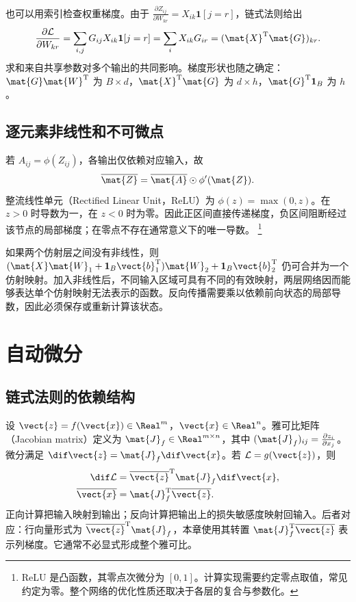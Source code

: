 \documentclass[../textbook.tex]{subfiles}
\begin{document}
也可以用索引检查权重梯度。由于
$\frac{\partial Z_{ij}}{\partial W_{kr}}=X_{ik}\mathbf1[j=r]$，链式法则给出
\begin{equation}
 \frac{\partial\mathcal L}{\partial W_{kr}}
 =\sum_{i,j}G_{ij}X_{ik}\mathbf1[j=r]
 =\sum_iX_{ik}G_{ir}=(\mat{X}^{\mathrm{T}}\mat{G})_{kr}.
\end{equation}
求和来自共享参数对多个输出的共同影响。梯度形状也随之确定：$\mat{G}\mat{W}^{\mathrm{T}}$ 为 $B\times d$，$\mat{X}^{\mathrm{T}}\mat{G}$ 为 $d\times h$，$\mat{G}^{\mathrm{T}}\mathbf1_B$ 为 $h$。

\subsection{逐元素非线性和不可微点}
若 $A_{ij}=\phi(Z_{ij})$，各输出仅依赖对应输入，故
\begin{equation}
 \overline{\mat{Z}}=\overline{\mat{A}}\odot\phi'(\mat{Z}).
 \label{eq:tensor-elementwise}
\end{equation}
整流线性单元（Rectified Linear Unit，ReLU）为 $\phi(z)=\max(0,z)$。在 $z>0$ 时导数为一，在 $z<0$ 时为零。因此正区间直接传递梯度，负区间阻断经过该节点的局部梯度；在零点不存在通常意义下的唯一导数。
\footnote{ReLU 是凸函数，其零点次微分为 $[0,1]$。计算实现需要约定零点取值，常见约定为零。整个网络的优化性质还取决于各层的复合与参数化。}

如果两个仿射层之间没有非线性，则
$(\mat{X}\mat{W}_1+\mathbf1_B\vect{b}_1^{\mathrm{T}})\mat{W}_2+\mathbf1_B\vect{b}_2^{\mathrm{T}}$
仍可合并为一个仿射映射。加入非线性后，不同输入区域可具有不同的有效映射，两层网络因而能够表达单个仿射映射无法表示的函数。反向传播需要乘以依赖前向状态的局部导数，因此必须保存或重新计算该状态。

\section{自动微分}

\subsection{链式法则的依赖结构}
设 $\vect{z}=f(\vect{x})\in\Real^m$，$\vect{x}\in\Real^n$。雅可比矩阵（Jacobian matrix）定义为 $\mat{J}_f\in\Real^{m\times n}$，其中 $(\mat{J}_f)_{ij}=\frac{\partial z_i}{\partial x_j}$。微分满足 $\dif \vect{z}=\mat{J}_f\dif \vect{x}$。若 $\mathcal L=g(\vect{z})$，则
\begin{equation}\label{eq:tensor-vjp}
\begin{aligned}
 \dif\mathcal L &= \overline{\vect{z}}^{\mathrm{T}}\mat{J}_f\dif \vect{x}, \\
 \overline{\vect{x}} &= \mat{J}_f^{\mathrm{T}}\overline{\vect{z}}.
\end{aligned}
\end{equation}
正向计算把输入映射到输出；反向计算把输出上的损失敏感度映射回输入。后者对应：行向量形式为 $\overline{\vect{z}}^{\mathrm{T}}\mat{J}_f$，本章使用其转置 $\mat{J}_f^{\mathrm{T}}\overline{\vect{z}}$ 表示列梯度。它通常不必显式形成整个雅可比。
\end{document}
